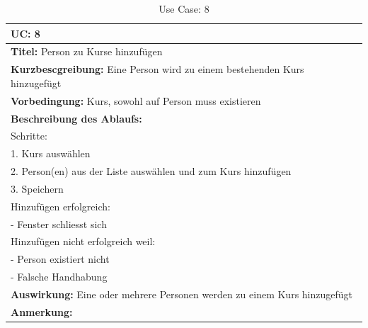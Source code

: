 %
%
\begin{table}[h]
\caption{Use Case: 8}
\begin{tabular}[ht]{|p{15cm}|}
  \hline
  \textbf{UC:} 8\\
  \hline
  \textbf{Titel:} Person zu Kurse hinzufügen\\
  \hline
  \textbf{Kurzbescgreibung:} Eine Person wird zu einem bestehenden Kurs hinzugefügt\\
  \hline
  \textbf{Vorbedingung:} Kurs, sowohl auf Person muss existieren\\
  \hline
  \textbf{Beschreibung des Ablaufs:}\\
Schritte:\\
1. Kurs auswählen\\
2. Person(en) aus der Liste auswählen und zum Kurs hinzufügen\\
3. Speichern\\
Hinzufügen erfolgreich:\\
- Fenster schliesst sich\\
Hinzufügen nicht erfolgreich weil:\\
- Person existiert nicht\\
- Falsche Handhabung\\
  \hline
  \textbf{Auswirkung:} Eine oder mehrere Personen werden zu einem Kurs hinzugefügt\\
  \hline
  \textbf{Anmerkung:}\\
  \hline
\end{tabular}
\end{table}
%
%
